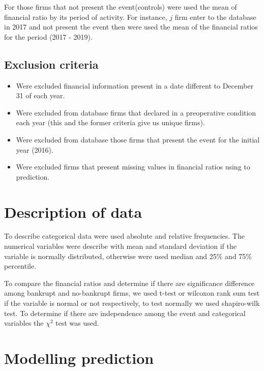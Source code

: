 \documentclass[journal]{IEEEtai}
\begin{document}
For those firms that not present the event(controls) were used the mean of financial ratio by its period of activity. For instance, $j$ firm enter to the database in 2017 and not present the event then were used the mean of the financial ratios for the period (2017 - 2019).
\subsection{Exclusion criteria}

\begin{itemize}

\item Were excluded financial information present in a date different to December 31 of each year.

\item Were excluded from database firms that declared in a preoperative condition each year (this and the former criteria give us unique firms).


\item Were excluded from database those firms that present the event for the initial year (2016). 


\item Were excluded firms that present missing  values in financial ratios using to prediction. 
\end{itemize}


\section{Description of data}

To describe categorical data were used absolute and relative frequencies. The numerical variables were describe with mean and standard deviation if the variable is normally distributed, otherwise were used median and 25\% and 75\% percentile.


To compare the financial ratios and determine if there are significance difference  among bankrupt and no-bankrupt firms, we used t-test or wilcoxon rank sum test if the variable is normal or not respectively, to test normally we used  shapiro-wilk test. To determine if there are independence among the event and categorical variables the $\chi^{2}$ test was used. 






\section{Modelling prediction}
\end{document}
